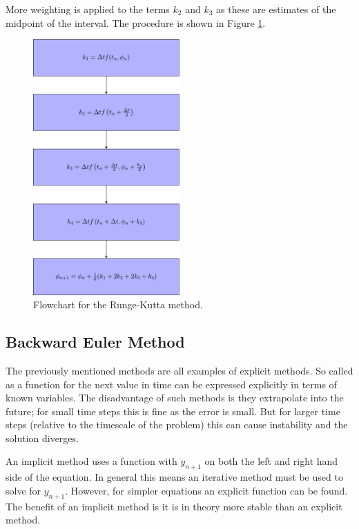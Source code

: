 \documentclass[../Interim_Report_Master]{subfiles}
\begin{document}
More weighting is applied to the terms $k_2$ and $k_3$ as these are estimates of the midpoint of the interval. The procedure is shown in Figure \ref{runge_kutta}.
\begin{figure}
	\centering
	\includegraphics[width=0.5\textwidth]{./Diagrams/Runge_Kutta_Method_Flowchart/Runge_Kutta_Method_Flowchart.pdf}
	\caption{Flowchart for the Runge-Kutta method.}
	\label{runge_kutta}
\end{figure}

\subsection{Backward Euler Method}
The previously mentioned methods are all examples of explicit methods. So called as a function for the next value in time can be expressed explicitly in terms of known variables. The disadvantage of such methods is they extrapolate into the future; for small time steps this is fine as the error is small. But for larger time steps (relative to the timescale of the problem) this can cause instability and the solution diverges. 

An implicit method uses a function with $y_{n+1}$ on both the left and right hand side of the equation. In general this means an iterative method must be used to solve for $y_{n+1}$. However, for simpler equations an explicit function can be found. The benefit of an implicit method is it is in theory more stable than an explicit method.
\end{document}
